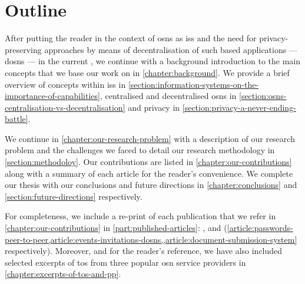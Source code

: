 \documentclass[showtrims,oldfontcommands]{kthesis}
\begin{document}
\section{Outline}
    \label{section:outline}
After putting the reader in the context of \acp{osn} as \acp{is} and the need for 
privacy-preserving approaches by means of decentralisation of such \Internet based 
applications --- \acp{dosn} --- in the current , 
we continue with a background introduction to the main concepts that we base our 
work on in \cref{chapter:background}. We provide a brief overview of concepts within 
\acp{is} in \cref{section:information-systems-on-the-importance-of-capabilities}, 
centralised and decentralised \acp{osn} in \cref{section:osns-centralisation-vs-decentralisation} 
and privacy in \cref{section:privacy-a-never-ending-battle}.

We continue in \cref{chapter:our-research-problem} with a description of our research 
problem and the challenges we faced to detail our research methodology 
in \cref{section:methodoloy}. Our contributions are listed in \cref{chapter:our-contributions} 
along with a summary of each article for the reader's convenience. We complete our 
thesis with our conclusions and future directions in \cref{chapter:conclusions} 
and \cref{section:future-directions} respectively. 

For completeness, we include a re-print of each publication that we refer in \cref{chapter:our-contributions} 
in \cref{part:published-articles}: ,  
and  (\cref{article:passwords-peer-to-peer,article:events-invitations-dosns,,article:document-submission-system} 
respectively). Moreover, and for the reader's reference, we have also included selected 
excerpts of \ac{tos} from three popular \ac{osn} service providers in \cref{chapter:excerpts-of-tos-and-pp}.
\end{document}
